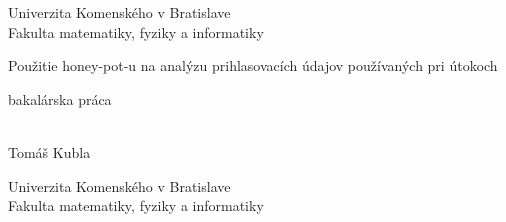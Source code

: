 \documentclass[12pt, oneside]{book}
\def\mfyear{2015}
\def\mftitle{Použitie honey-pot-u na analýzu prihlasovacích údajov používaných pri útokoch}
\def\mfthesistype{bakalárska práca}
\def\mfauthor{Tomáš Kubla}
\begin{document}
     

\thispagestyle{empty}
\noindent

\begin{minipage}{0.95\textwidth}
\begin{center}
\sc  
\large
\vspace*{0.3cm} Univerzita Komenského v Bratislave\\
\vspace*{0.3cm} Fakulta matematiky, fyziky a informatiky\\
\end{center}
\end{minipage}

\vfill

\begin{minipage}{1.1\textwidth}
\begin{flushright}
\bigskip\bigskip
\begin{center}
\sc\LARGE\mftitle
\end{center}
\bigskip
\centerline{\sc\mfthesistype}

\bigskip\bigskip\bigskip\bigskip
\end{flushright}
\end{minipage}
\vfill

\noindent \mfyear\\
\indent\mfauthor

\eject %


\thispagestyle{empty}
\noindent

\begin{minipage}{0.95\textwidth}
\begin{center}
\sc  
\large
\vspace*{0.3cm} Univerzita Komenského v Bratislave\\
\vspace*{0.3cm} Fakulta matematiky, fyziky a informatiky\\
\end{center}
\end{minipage}

\vfill
\end{document}

